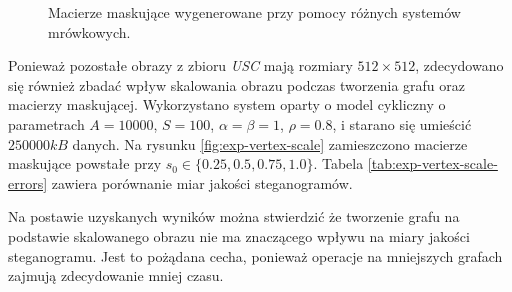 {\begin{figure}
        \caption[Porównania wizualizacji konwersji oraz macierzy maskujących.]
        {
            Macierze maskujące wygenerowane przy pomocy różnych systemów mrówkowych.
        }
        \label{fig:exp-vertex-pher}
    \end{figure}

    Ponieważ pozostałe obrazy z zbioru \textit{USC} mają rozmiary $512 \times 512$, zdecydowano się również zbadać wpływ
    skalowania obrazu podczas tworzenia grafu oraz macierzy maskującej. Wykorzystano system oparty o model cykliczny o
    parametrach $A=10000$, $S=100$, $\alpha=\beta=1$, $\rho=0.8$, i starano się umieścić $250 000kB$ danych. Na rysunku
    \ref{fig:exp-vertex-scale} zamieszczono macierze maskujące powstałe przy $s_0 \in \{0.25, 0.5, 0.75, 1.0\}$. Tabela
    \ref{tab:exp-vertex-scale-errors} zawiera porównanie miar jakości steganogramów.

    Na postawie uzyskanych wyników można stwierdzić że tworzenie grafu na podstawie skalowanego obrazu nie ma znaczącego
    wpływu na miary jakości steganogramu. Jest to pożądana cecha, ponieważ operacje na mniejszych grafach zajmują
    zdecydowanie mniej czasu.

}
